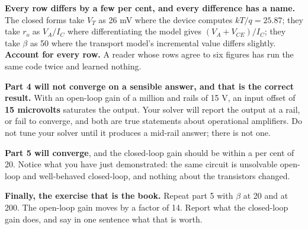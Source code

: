 \textbf{Every row differs by a few per cent, and every difference has a name.} The closed forms take $V_T$ as 26 mV where the device computes $kT/q = 25.87$; they take $r_o$ as $V_A/I_C$ where differentiating the model gives $(V_A + V_{CE})/I_C$; they take $\beta$ as 50 where the transport model's incremental value differs slightly. \textbf{Account for every row.} A reader whose rows agree to six figures has run the same code twice and learned nothing.

\textbf{Part 4 will not converge on a sensible answer, and that is the correct result.} With an open-loop gain of a million and rails of 15 V, an input offset of \textbf{15 microvolts} saturates the output. Your solver will report the output at a rail, or fail to converge, and both are true statements about operational amplifiers. Do not tune your solver until it produces a mid-rail answer; there is not one.

\textbf{Part 5 will converge}, and the closed-loop gain should be within a per cent of 20. Notice what you have just demonstrated: the same circuit is unsolvable open-loop and well-behaved closed-loop, and nothing about the transistors changed.

\textbf{Finally, the exercise that is the book.} Repeat part 5 with $\beta$ at 20 and at 200. The open-loop gain moves by a factor of 14. Report what the closed-loop gain does, and say in one sentence what that is worth.
